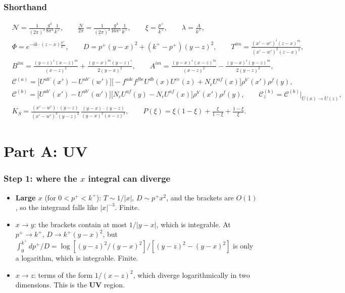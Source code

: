 \documentclass[10pt]{article}
\numberwithin{equation}{section}
\begin{document}
\section{Shorthand}
\begin{align}
&\mathcal{N}=\frac{1}{(2\pi)^{3}}\frac{g^{4}}{8\pi^{4}}\frac{1}{k^{+}},\qquad\frac{\mathcal{N}}{2\pi}=\frac{1}{(2\pi)^{3}}\frac{g^{4}}{16\pi^{5}}\frac{1}{k^{+}},\qquad \xi=\frac{p^{+}}{k^{+}},\qquad\lambda=\frac{\Lambda}{k^{+}},\\
&\Phi=e^{-ik\cdot(z-x)\frac{p^{+}}{k^{+}}},\qquad D=p^{+}(y-x)^{2}+(k^{+}-p^{+})(y-z)^{2},\qquad T^{im}=\frac{(x'-w')^{i}(z-x)^{m}}{(x'-w')^{2}(z-x)^{2}},\\
&B^{im}=\frac{(y-z)^{i}(x-z)^{m}}{(x-z)^{2}}+\frac{(y-x)^{m}(y-z)^{i}}{2(y-x)^{2}},\qquad A^{im}=\frac{(y-x)^{i}(x-z)^{m}}{(x-z)^{2}}-\frac{(y-x)^{i}(y-z)^{m}}{2(y-z)^{2}},\\
&\mathcal{C}^{(a)}=\Big[U^{ab'}(x')-U^{ab'}(w')\Big]\Big[-f^{adc}f^{fbe}U^{db}(x)U^{ce}(z)+N_{c}U^{af}(x)\Big]\rho^{b'}(x')\rho^{f}(y),\\
&\mathcal{C}^{(b)}=\Big[U^{ab'}(x')-U^{ab'}(w')\Big]\Big[N_{c}U^{af}(y)-N_{c}U^{af}(x)\Big]\rho^{b'}(x')\rho^{f}(y),\qquad
\mathcal{C}^{(b)}_{z}=\mathcal{C}^{(b)}\big|_{U(x)\to U(z)},\\
&K_{S}=\frac{(x'-w')\cdot(y-z)}{(x'-w')^{2}(y-z)^{2}}\,\frac{(y-x)\cdot(y-z)}{(y-x)^{2}(x-z)^{2}},\qquad P(\xi)=\xi(1-\xi)+\frac{\xi}{1-\xi}+\frac{1-\xi}{\xi}.
\end{align}

\part*{Part A: UV}

\section{Step 1: where the $x$ integral can diverge}
\begin{itemize}
\item \textbf{Large $x$} (for $0<p^{+}<k^{+}$): $T\sim1/|x|$, $D\sim p^{+}x^{2}$, and the brackets are $O(1)$, so the integrand falls like $|x|^{-3}$. Finite.
\item \textbf{$x\to y$}: the brackets contain at most $1/|y-x|$, which is integrable. At $p^{+}\to k^{+}$, $D\to k^{+}(y-x)^{2}$, but $\int_{0}^{k^{+}}dp^{+}/D=\log[(y-z)^{2}/(y-x)^{2}]/[(y-z)^{2}-(y-x)^{2}]$ is only a logarithm, which is integrable. Finite.
\item \textbf{$x\to z$}: terms of the form $1/(x-z)^{2}$, which diverge logarithmically in two dimensions. This is the \textbf{UV} region.
\end{itemize}
\end{document}
